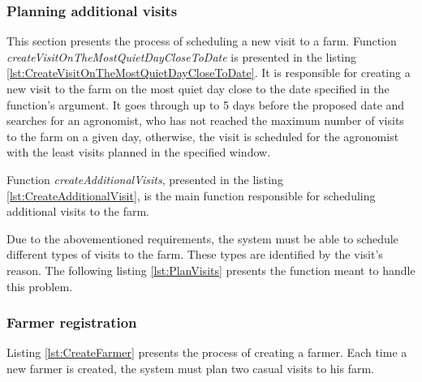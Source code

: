 

\subsubsection*{Planning additional visits}

This section presents the process of scheduling a new visit to a farm. Function \textit{createVisitOnTheMostQuietDayCloseToDate} is presented in the listing \ref{lst:CreateVisitOnTheMostQuietDayCloseToDate}. It is responsible for creating a new visit to the farm on the most quiet day close to the date specified in the function's argument. It goes through up to 5 days before the proposed date and searches for an agronomist, who has not reached the maximum number of visits to the farm on a given day, otherwise, the visit is scheduled for the agronomist with the least visits planned in the specified window.



Function \textit{createAdditionalVisits}, presented in the listing \ref{lst:CreateAdditionalVisit}, is the main function responsible for scheduling additional visits to the farm.



Due to the abovementioned requirements, the system must be able to schedule different types of visits to the farm. These types are identified by the visit's reason. The following listing \ref{lst:PlanVisits} presents the function meant to handle this problem.



\subsubsection*{Farmer registration}

Listing \ref{lst:CreateFarmer} presents the process of creating a farmer. Each time a new farmer is created, the system must plan two casual visits to his farm.

